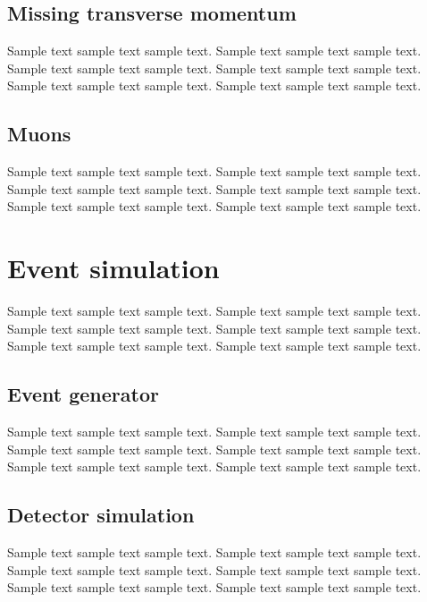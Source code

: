 \subsection{Missing transverse momentum}
Sample text sample text sample text. Sample text sample text sample text.
Sample text sample text sample text. Sample text sample text sample text.
Sample text sample text sample text. Sample text sample text sample text.

\subsection{Muons}
Sample text sample text sample text. Sample text sample text sample text.
Sample text sample text sample text. Sample text sample text sample text.
Sample text sample text sample text. Sample text sample text sample text.

\section{Event simulation}
Sample text sample text sample text. Sample text sample text sample text.
Sample text sample text sample text. Sample text sample text sample text.
Sample text sample text sample text. Sample text sample text sample text.

\subsection{Event generator}
Sample text sample text sample text. Sample text sample text sample text.
Sample text sample text sample text. Sample text sample text sample text.
Sample text sample text sample text. Sample text sample text sample text.

\subsection{Detector simulation}
Sample text sample text sample text. Sample text sample text sample text.
Sample text sample text sample text. Sample text sample text sample text.
Sample text sample text sample text. Sample text sample text sample text.
